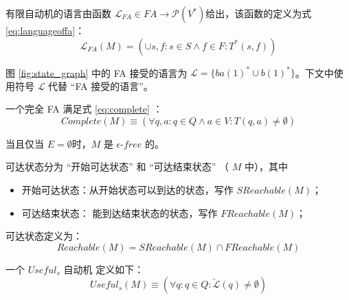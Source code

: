 \begin{definition}
    有限自动机的语言由函数 $\mathcal{L}_{FA} \in FA \longrightarrow \mathcal{P}(V^*) $给出，该函数的定义为式 \ref{eq:languageoffa}： 
    \begin{equation}\label{eq:languageoffa}
        \mathcal{L}_{FA} (M) = (\cup s,f:s \in S \land f \in F : T^* (s,f))
    \end{equation}
\end{definition}

\begin{example}[FA 的语言]
    图 \ref{fig:state_graph} 中的 FA 接受的语言为 $ \mathcal{L}= \{ ba(1)^*\cup b(1)^* \}$。下文中使用符号 $\mathcal{L}$ 代替 “FA 接受的语言”。
\end{example}

\begin{definition}[完全 FA ($Complete$)]\label{def:complete}
    一个完全 FA 满足式 \ref{eq:complete} ：
    \begin{equation} \label{eq:complete}
        Complete(M) \equiv ( \forall q,a:q\in Q \land a \in V : T(q,a) \not= \emptyset ) 
    \end{equation}
\end{definition}

\begin{definition}
    当且仅当 $E=\emptyset$时，$M$ 是 $\epsilon$-$free$ 的。
\end{definition}

\begin{definition}\label{def:rechable-state}
    可达状态分为 “开始可达状态” 和 “可达结束状态” （ $M$ 中），其中
    \begin{itemize}
        \item 开始可达状态：从开始状态可以到达的状态，写作 $SReachable(M)$；
        \item 可达结束状态： 能到达结束状态的状态，写作 $FReachable(M)$；
    \end{itemize}
    可达状态定义为：
    \[ Reachable(M) = SReachable(M) \cap FReachable(M) \]
\end{definition}

\begin{definition}
    一个 $Useful_s$ 自动机 定义如下： 
    \[ Useful_s (M) \equiv ( \forall q:q \in Q : \overleftarrow{\mathcal{L}} (q) \not= \emptyset ) \]
\end{definition}


